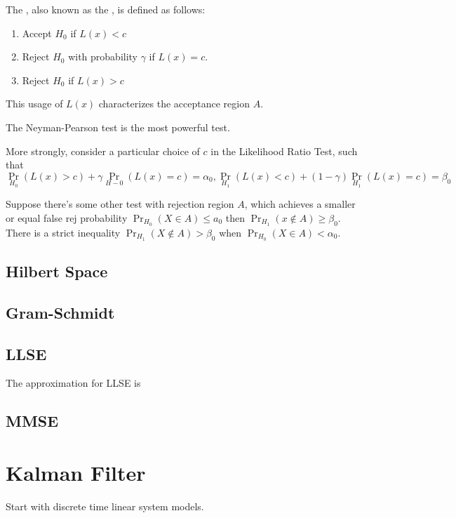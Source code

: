 \documentclass{article}
\begin{document}
\begin{definition}
	The , also known as the , is defined as follows:

	\begin{enumerate}
		\item Accept $H_0$ if $L(x) < c$
		\item Reject $H_0$ with probability $\gamma$ if $L(x) = c$.
		\item Reject $H_0$ if $L(x) > c$
	\end{enumerate}

	This usage of $L(x)$ characterizes the acceptance region $A$.
\end{definition}

\begin{lemma}
	The Neyman-Pearson test is the most powerful test. 

	More strongly, consider a particular choice of $c$ in the Likelihood Ratio Test, such that 
	\[\Pr_{H_0}(L(x) > c) + \gamma \Pr_{H-0} (L(x) = c) = \alpha_0, \Pr_{H_1}(L(x) < c) + (1 - \gamma) \Pr_{H_1}(L(x) = c) = \beta_0 \]

	Suppose there's some other test with rejection region $A$, which achieves a smaller or equal false rej probability $\Pr_{H_0} (X \in A) \leq a_0$ then $\Pr_{H_1}(x \not \in A) \geq \beta_0$. There is a strict inequality $\Pr_{H_1} (X \not \in A) > \beta_0$ when $\Pr_{H_0} (X \in A) < \alpha_0$.
\end{lemma}
\subsection{Hilbert Space}
\subsection{Gram-Schmidt}
\subsection{LLSE}
The approximation for LLSE is 
\subsection{MMSE}

\section{Kalman Filter}
Start with discrete time linear system models.
\end{document}
